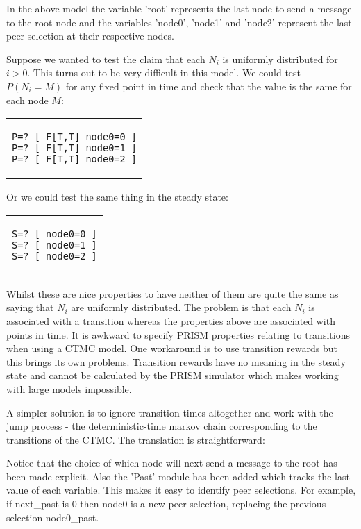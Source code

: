 \documentclass[a4paper,10pt]{article}
\newcommand{\prismmodel}[1]{
  \begin{quotation}
  \footnotesize
  
  \end{quotation}
}
\newenvironment{prismprop}[0]{
  \begin{center}
  \begin{tabular}{c}
  \footnotesize
}{
  \end{tabular}
  \end{center}
}
\begin{document}
In the above model the variable 'root' represents the last node to send a message to the root node and the variables 'node0', 'node1' and 'node2' represent the last peer selection at their respective nodes.

Suppose we wanted to test the claim that each $N_i$ is uniformly distributed for $i>0$. This turns out to be very difficult in this model. We could test $P(N_i = M)$ for any fixed point in time and check that the value is the same for each node $M$:

\begin{prismprop}
\begin{lstlisting}
P=? [ F[T,T] node0=0 ]
P=? [ F[T,T] node0=1 ]
P=? [ F[T,T] node0=2 ]
\end{lstlisting}
\end{prismprop}

Or we could test the same thing in the steady state:

\begin{prismprop}
\begin{lstlisting}
S=? [ node0=0 ]
S=? [ node0=1 ]
S=? [ node0=2 ]
\end{lstlisting}
\end{prismprop}

Whilst these are nice properties to have neither of them are quite the same as saying that $N_i$ are uniformly distributed. The problem is that each $N_i$ is associated with a transition whereas the properties above are associated with points in time. It is awkward to specify PRISM properties relating to transitions when using a CTMC model. One workaround is to use transition rewards but this brings its own problems. Transition rewards have no meaning in the steady state and cannot be calculated by the PRISM simulator which makes working with large models impossible.

A simpler solution is to ignore transition times altogether and work with the jump process - the deterministic-time markov chain corresponding to the transitions of the CTMC. The translation is straightforward:

\prismmodel{dtmc_single}

Notice that the choice of which node will next send a message to the root has been made explicit. Also the 'Past' module has been added which tracks the last value of each variable. This makes it easy to identify peer selections. For example, if next\_past is 0 then node0 is a new peer selection, replacing the previous selection node0\_past.
\end{document}
